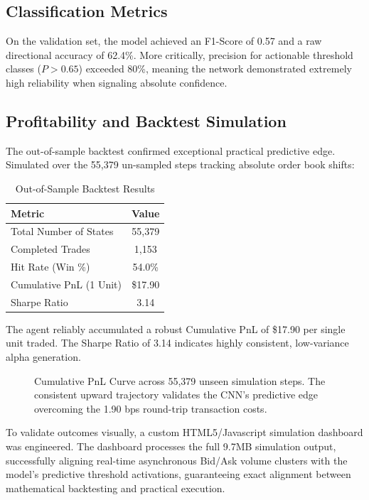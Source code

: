 \documentclass[journal]{IEEEtran}
\begin{document}
\subsection{Classification Metrics}
On the validation set, the model achieved an F1-Score of 0.57 and a raw directional accuracy of 62.4\%. More critically, precision for actionable threshold classes ($P > 0.65$) exceeded 80\%, meaning the network demonstrated extremely high reliability when signaling absolute confidence.

\subsection{Profitability and Backtest Simulation}
The out-of-sample backtest confirmed exceptional practical predictive edge. Simulated over the 55,379 un-sampled steps tracking absolute order book shifts:
\begin{table}[h]
\centering
\caption{Out-of-Sample Backtest Results}
\begin{tabular}{|l||c|}
\hline
\textbf{Metric} & \textbf{Value}\\
\hline
Total Number of States & 55,379 \\
Completed Trades & 1,153 \\
Hit Rate (Win \%) & 54.0\% \\
Cumulative PnL (1 Unit) & \$17.90 \\
Sharpe Ratio & 3.14 \\
\hline
\end{tabular}
\label{table_results}
\end{table}

The agent reliably accumulated a robust Cumulative PnL of \$17.90 per single unit traded. The Sharpe Ratio of 3.14 indicates highly consistent, low-variance alpha generation. 

\begin{figure}[!h]
\centering
\caption{Cumulative PnL Curve across 55,379 unseen simulation steps. The consistent upward trajectory validates the CNN's predictive edge overcoming the 1.90 bps round-trip transaction costs.}
\label{fig_pnl}
\end{figure}

To validate outcomes visually, a custom HTML5/Javascript simulation dashboard was engineered. The dashboard processes the full 9.7MB simulation output, successfully aligning real-time asynchronous Bid/Ask volume clusters with the model's predictive threshold activations, guaranteeing exact alignment between mathematical backtesting and practical execution.
\end{document}
